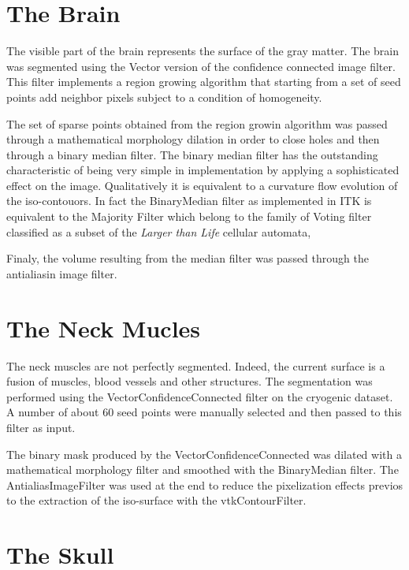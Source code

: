 \section*{The Brain}

The visible part of the brain represents the surface of the gray matter.  The
brain was segmented using the Vector version of the confidence connected image
filter.  This filter implements a region growing algorithm that starting from a
set of seed points add neighbor pixels subject to a condition of homogeneity.

The set of sparse points obtained from the region growin algorithm was passed
through a mathematical morphology dilation in order to close holes and then
through a binary median filter. The binary median filter has the outstanding
characteristic of being very simple in implementation by applying a
sophisticated effect on the image. Qualitatively it is equivalent to a
curvature flow evolution of the iso-contouors. In fact the BinaryMedian filter
as implemented in ITK is equivalent to the Majority Filter which belong to the
family of Voting filter classified as a subset of the \emph{Larger than Life}
cellular automata, 

Finaly, the volume resulting from the median filter was passed through the 
antialiasin image filter.


\section*{The Neck Mucles}

The neck muscles are not perfectly segmented. Indeed, the current surface is a
fusion of muscles, blood vessels and other structures. The segmentation was
performed using the VectorConfidenceConnected filter on the cryogenic dataset.
A number of about 60 seed points were manually selected and then passed to this
filter as input.

The binary mask produced by the VectorConfidenceConnected was dilated with a 
mathematical morphology filter and smoothed with the BinaryMedian filter. The 
AntialiasImageFilter was used at the end to reduce the pixelization effects
previos to the extraction of the iso-surface with the vtkContourFilter.  



\section*{The Skull}

